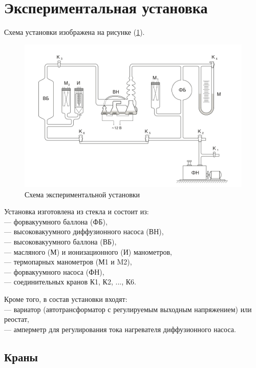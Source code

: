 \documentclass[a4paper,12pt]{article} %
\begin{document}
\section*{Экспериментальная установка}

Схема установки изображена на рисунке (\ref{fig:setup}). 

\medskip

\begin{figure}[h]
  \centering
  \includegraphics[scale = 1]{images/setup.png}
  \caption{Схема экспериментальной установки}
  \label{fig:setup}
\end{figure}

Установка изготовлена из стекла и состоит из: \\ 
— форвакуумного баллона (ФБ), \\ 
— высоковакуумного диффузионного насоса (ВН), \\ 
— высоковакуумного баллона (ВБ), \\ 
— масляного (М) и ионизационного (И) манометров, \\ 
— термопарных манометров (М1 и M2), \\ 
— форвакуумного насоса (ФН), \\ 
— соединительных кранов К1, К2, ..., К6. 

Кроме того, в состав установки входят: \\ 
— вариатор (автотрансформатор с регулируемым выходным напряжением) или реостат, \\ 
— амперметр для регулирования тока нагревателя диффузионного насоса.

\subsection*{Краны}
\end{document}
